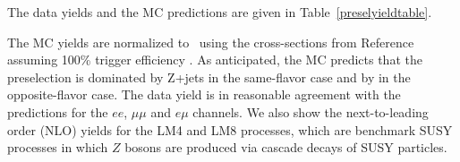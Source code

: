 

The data yields and the MC predictions are given in Table~\ref{preselyieldtable}.

The MC yields are normalized to \lumi\ using the cross-sections
from Reference~\cite{ref:xsec} assuming 100\% trigger efficiency 
.
As anticipated, the MC predicts that the preselection is dominated by Z+jets in the same-flavor 
case and by \ttbar in the opposite-flavor case.  
The data yield is in reasonable agreement with the predictions for the $ee$, $\mu\mu$ and $e\mu$ channels.
We also show the next-to-leading order (NLO) yields for the LM4 and LM8 processes, which are benchmark
SUSY processes in which $Z$ bosons are produced via cascade decays of SUSY particles. 




